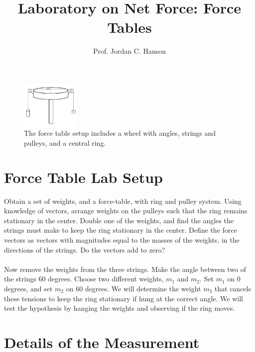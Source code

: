 \documentclass{article}
\begin{document}
\title{Laboratory on Net Force: Force Tables}
\author{Prof. Jordan C. Hanson}

\maketitle

\begin{figure}[ht]
\centering
\includegraphics[width=0.25\textwidth]{figures/Table.pdf}
\caption{\label{fig:table} The force table setup includes a wheel with angles, strings and pulleys, and a central ring.}
\end{figure}

\section{Force Table Lab Setup}

Obtain a set of weights, and a force-table, with ring and pulley system.  Using knowledge of vectors, arrange weights on the pulleys such that the ring remains stationary in the center.  Double one of the weights, and find the angles the strings must make to keep the ring stationary in the center.  Define the force vectors as vectors with magnitudes equal to the masses of the weights, in the directions of the strings.  Do the vectors add to zero?
\noindent
\\ \\
Now remove the weights from the three strings.  Make the angle between two of the strings 60 degrees.  Choose two different weights, $m_1$ and $m_2$.  Set $m_1$ on 0 degrees, and set $m_2$ on 60 degrees.  We will determine the weight $m_3$ that cancels these tensions to keep the ring stationary if hung at the correct angle.  We will test the hypothesis by hanging the weights and observing if the ring moves.

\section{Details of the Measurement}
\end{document}

